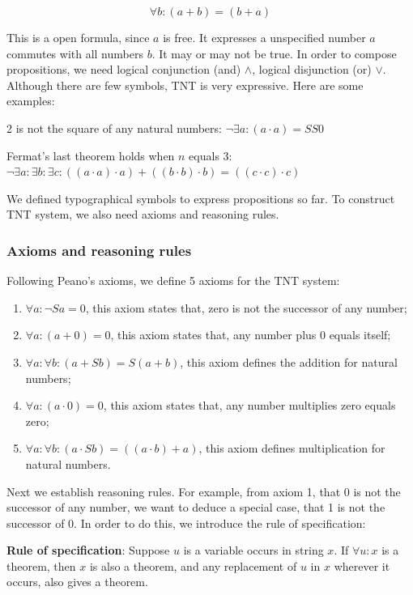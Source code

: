 \documentclass{article}
\begin{document}
\[
\forall b : (a + b) = (b + a)
\]

This is a open formula, since $a$ is free. It expresses a unspecified number $a$ commutes with all numbers $b$. It may or may not be true. In order to compose propositions, we need logical conjunction (and) $\land$, logical disjunction (or) $\lor$. Although there are few symbols, TNT is very expressive. Here are some examples:

2 is not the square of any natural numbers: $\lnot \exists a : (a \cdot a) = SS0$

Fermat's last theorem holds when $n$ equals 3: $\lnot \exists a : \exists b : \exists c : ((a \cdot a) \cdot a) + ((b \cdot b) \cdot b) = ((c \cdot c) \cdot c)$

We defined typographical symbols to express propositions so far. To construct TNT system, we also need axioms and reasoning rules.

\subsubsection{Axioms and reasoning rules}

Following Peano's axioms, we define 5 axioms for the TNT system:

\begin{enumerate}
\item $\forall a : \lnot Sa = 0$, this axiom states that, zero is not the successor of any number;
\item $\forall a: (a + 0) = 0$, this axiom states that, any number plus 0 equals itself;
\item $\forall a: \forall b: (a + Sb) = S(a + b)$, this axiom defines the addition for natural numbers;
\item $\forall a: (a \cdot 0) = 0$, this axiom states that, any number multiplies zero equals zero;
\item $\forall a: \forall b: (a \cdot Sb) = ((a \cdot b) + a)$, this axiom defines multiplication for natural numbers.
\end{enumerate}

Next we establish reasoning rules. For example, from axiom 1, that 0 is not the successor of any number, we want to deduce a special case, that 1 is not the successor of 0. In order to do this, we introduce the rule of specification:

\textbf{Rule of specification}: Suppose $u$ is a variable occurs in string $x$. If $\forall u: x$ is a theorem, then $x$ is also a theorem, and any replacement of $u$ in $x$ wherever it occurs, also gives a theorem.
\end{document}
